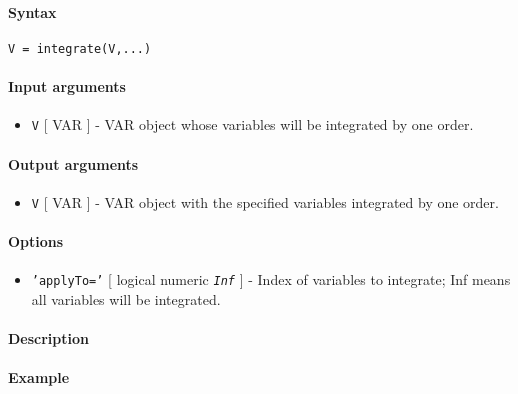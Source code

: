 


	\paragraph{Syntax}\label{syntax}

\begin{verbatim}
V = integrate(V,...)
\end{verbatim}

\paragraph{Input arguments}\label{input-arguments}

\begin{itemize}
\itemsep1pt\parskip0pt
\item
  \texttt{V} {[} VAR {]} - VAR object whose variables will be integrated
  by one order.
\end{itemize}

\paragraph{Output arguments}\label{output-arguments}

\begin{itemize}
\itemsep1pt\parskip0pt
\item
  \texttt{V} {[} VAR {]} - VAR object with the specified variables
  integrated by one order.
\end{itemize}

\paragraph{Options}\label{options}

\begin{itemize}
\itemsep1pt\parskip0pt
\item
  \texttt{'applyTo='} {[} logical \textbar{} numeric \textbar{}
  \emph{\texttt{Inf}} {]} - Index of variables to integrate; Inf means
  all variables will be integrated.
\end{itemize}

\paragraph{Description}\label{description}

\paragraph{Example}\label{example}



